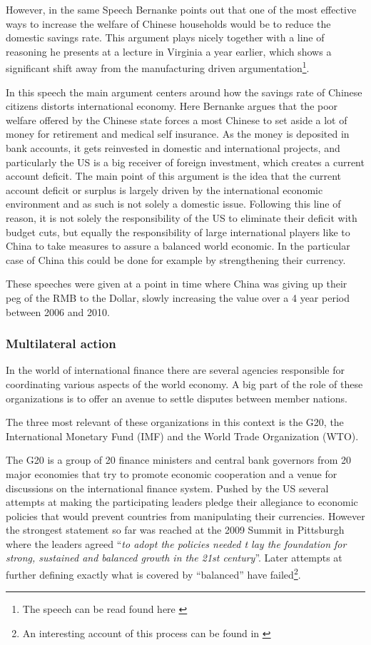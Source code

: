 However, in the same Speech Bernanke points out that one of the most 
effective ways to increase the welfare of Chinese households would be to 
reduce the domestic savings rate. This argument plays nicely together 
with a line of reasoning he presents at a lecture in Virginia a year 
earlier, which shows a significant shift away from the manufacturing 
driven argumentation\footnote{The speech can be read found here 
\cite{Bernanke05}}.

In this speech the main argument centers around how the savings rate 
of Chinese citizens distorts international economy. Here Bernanke argues 
that the poor welfare offered by the Chinese state forces a most Chinese 
to set aside a lot of money for retirement and medical self insurance.  
As the money is deposited in bank accounts, it gets reinvested in 
domestic and international projects, and particularly the US is a big 
receiver of foreign investment, which creates a current account deficit.  
The main point of this argument is the idea that the current account 
deficit or surplus is largely driven by the international economic 
environment and as such is not solely a domestic issue. Following this 
line of reason, it is not solely the responsibility of the US to 
eliminate their deficit with budget cuts, but equally the responsibility 
of large international players like to China to take measures to assure 
a balanced world economic. In the particular case of China this could be 
done for example by strengthening their currency.

These speeches were given at a point in time where China was giving up 
their peg of the RMB to the Dollar, slowly increasing the value over a 4 
year period between 2006 and 2010.

\subsubsection{Multilateral action}

In the world of international finance there are several agencies 
responsible for coordinating various aspects of the world economy. A big 
part of the role of these organizations is to offer an avenue to settle 
disputes between member nations. %

The three most relevant of these organizations in this context is the 
G20, the International Monetary Fund (IMF) and the World Trade 
Organization (WTO).

The G20 is a group of 20 finance ministers and central bank governors 
from 20 major economies that try to promote economic cooperation and a 
venue for discussions on the international finance system. Pushed by the 
US several attempts at making the participating leaders pledge their 
allegiance to economic policies that would prevent countries from 
manipulating their currencies. However the strongest statement so far 
was reached at the 2009 Summit in Pittsburgh where the leaders agreed 
``\textit{to adopt the policies needed t lay the foundation for strong, 
sustained and balanced growth in the 21st century}''. Later attempts at 
further defining exactly what is covered by ``balanced'' have 
failed\footnote{An interesting account of this process can be found in 
\cite{Levy11}}.

